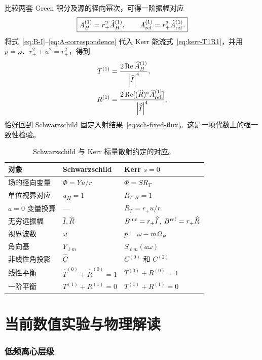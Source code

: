 \documentclass[UTF8,a4paper,11pt]{ctexart}
\newcommand{\Bin}{B^{\rm inc}}
\newcommand{\Bref}{B^{\rm ref}}
\newcommand{\abs}[1]{\left|#1\right|}
\newcommand{\Ree}{\operatorname{Re}}
\begin{document}
比较两套 Green 积分及源的径向幂次，可得一阶振幅对应
\begin{equation}
\boxed{
A_H^{(1)}=r_+^2\widehat A_H^{(1)},\qquad
A_{\rm ref}^{(1)}=r_+^3\widehat A_{\rm ref}^{(1)}.}
\label{eq:A-correspondence}
\end{equation}
将式~\eqref{eq:B-I}--\eqref{eq:A-correspondence} 代入 Kerr 能流式~\eqref{eq:kerr-T1R1}，并用 $p=\omega$、$r_+^2+a^2=r_+^2$，得到
\begin{align}
T^{(1)}&=\frac{2\Ree\widehat A_H^{(1)}}{\abs{\widehat I}^4},\\
R^{(1)}&=\frac{2\Ree[(\widehat R)^*\widehat A_{\rm ref}^{(1)}]}
{\abs{\widehat I}^4},
\end{align}
恰好回到 Schwarzschild 固定入射结果~\eqref{eq:sch-fixed-flux}。这是一项代数上的强一致性检验。

\begin{table}[htbp]
\centering
\caption{Schwarzschild 与 Kerr 标量散射约定的对应。}
\label{tab:correspondence}
\begin{tabularx}{\textwidth}{>{\raggedright\arraybackslash}p{}XX}
\toprule
对象 & Schwarzschild & Kerr $s=0$ \\
\midrule
场的径向变量 & $\Phi=Yu/r$ & $\Phi=SR_T$ \\
单位视界对应 & $u_H=1$ & $R_{T,H}=1$ \\
$a=0$ 变量换算 & --- & $R_T=r_+u/r$ \\
无穷远振幅 & $\widehat I,\widehat R$ & $\Bin=r_+\widehat I$, $\Bref=r_+\widehat R$ \\
视界波数 & $\omega$ & $p=\omega-m\Omega_H$ \\
角向基 & $Y_{\ell m}$ & $S_{\ell m}(a\omega)$ \\
非线性角投影 & $\widehat C$ & $C^{(0)}$ 和 $C^{(2)}$ \\
线性平衡 & $\widehat T^{(0)}+\widehat R^{(0)}=1$ & $T^{(0)}+R^{(0)}=1$ \\
一阶平衡 & $T^{(1)}+R^{(1)}=0$ & $T^{(1)}+R^{(1)}=0$ \\
\bottomrule
\end{tabularx}
\end{table}

\part{当前数值实验与物理解读}

\section{低频离心层级}
\end{document}
